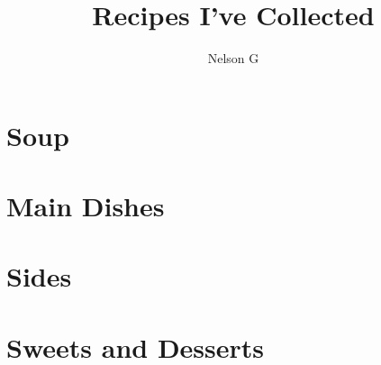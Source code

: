 \documentclass{book}
\title{Recipes I've Collected}
\author{Nelson G}
\begin{document}
\pagestyle{empty}
\maketitle
\tableofcontents

\pagestyle{main}



\chapter{Soup}


\chapter{Main Dishes}



















\chapter{Sides}


\chapter{Sweets and Desserts}





\end{document}
